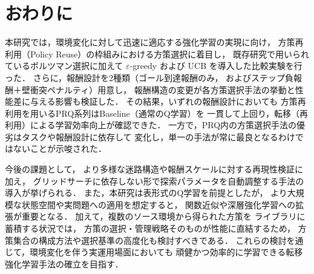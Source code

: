 \section{おわりに}
本研究では，環境変化に対して迅速に適応する強化学習の実現に向け，
方策再利用（Policy Reuse）の枠組みにおける方策選択に着目し，
既存研究で用いられているボルツマン選択に加えて 
$\varepsilon$-greedy および UCB を導入した比較実験を行った．
さらに，報酬設計を2種類（ゴール到達報酬のみ，
およびステップ負報酬＋壁衝突ペナルティ）用意し，
報酬構造の変更が各方策選択手法の挙動と性能差に与える影響も検証した．
その結果，いずれの報酬設計においても
方策再利用を用いるPRQ系列はBaseline（通常のQ学習）を
一貫して上回り，転移（再利用）による学習効率向上が確認できた．
一方で，PRQ内の方策選択手法の優劣はタスクや報酬設計に依存して
変化し，単一の手法が常に最良となるわけではないことが示唆された．

今後の課題として，
より多様な迷路構造や報酬スケールに対する再現性検証に加え，
グリッドサーチに依存しない形で探索パラメータを自動調整する手法の
導入が挙げられる．
また，本研究は表形式のQ学習を前提としたが，
より大規模な状態空間や実問題への適用を想定すると，
関数近似や深層強化学習への拡張が重要となる．
加えて，複数のソース環境から得られた方策を
ライブラリに蓄積する状況では，
方策の選択・管理戦略そのものが性能に直結するため，
方策集合の構成方法や選択基準の高度化も検討すべきである．
これらの検討を通じて，環境変化を伴う実運用場面においても
頑健かつ効率的に学習できる転移強化学習手法の確立を目指す．